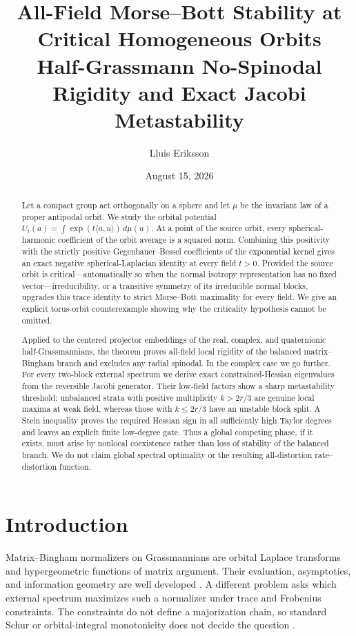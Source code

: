 \documentclass[11pt]{article}
\title{\bfseries All-Field Morse--Bott Stability at Critical Homogeneous Orbits\\[3pt]
\large Half-Grassmann No-Spinodal Rigidity and Exact Jacobi Metastability}
\author{Lluis Eriksson}
\date{August 15, 2026}
\begin{document}
\maketitle

\begin{abstract}
Let a compact group act orthogonally on a sphere and let $\mu$ be the
invariant law of a proper antipodal orbit.  We study the orbital potential
$U_t(a)=\int\exp(t\langle a,u\rangle)\,d\mu(u)$.  At a point of the source
orbit, every spherical-harmonic coefficient of the orbit average is a
squared norm.  Combining this positivity with the strictly positive
Gegenbauer--Bessel coefficients of the exponential kernel gives an exact
negative spherical-Laplacian identity at every field $t>0$.  Provided the
source orbit is critical---automatically so when the normal isotropy
representation has no fixed vector---irreducibility, or a transitive symmetry
of its irreducible normal blocks, upgrades this trace identity to strict
Morse--Bott maximality for every field.  We give an explicit torus-orbit
counterexample showing why the criticality hypothesis cannot be omitted.

Applied to the centered projector embeddings of the real, complex, and
quaternionic half-Grassmannians, the theorem proves all-field local rigidity
of the balanced matrix--Bingham branch and excludes any radial spinodal.  In
the complex case we go further.  For every two-block external spectrum we
derive exact constrained-Hessian eigenvalues from the reversible Jacobi
generator.  Their low-field factors show a sharp metastability threshold:
unbalanced strata with positive multiplicity $k>2r/3$ are genuine local
maxima at weak field, whereas those with $k\le 2r/3$ have an unstable block
split.  A Stein inequality proves the required Hessian sign in all
sufficiently high Taylor degrees and leaves an explicit finite low-degree
gate.  Thus a global competing phase, if it exists, must arise by nonlocal
coexistence rather than loss of stability of the balanced branch.  We do not
claim global spectral optimality or the resulting all-distortion
rate--distortion function.
\end{abstract}

\section{Introduction}

Matrix--Bingham normalizers on Grassmannians are orbital Laplace transforms
and hypergeometric functions of matrix argument.  Their evaluation,
asymptotics, and information geometry are well developed
\cite{James1964,Muirhead1982,Kent1994,BagyanRichards2024,CazzellaEtAl2026}.
A different problem asks which external spectrum maximizes such a normalizer
under trace and Frobenius constraints.  The constraints do not define a
majorization chain, so standard Schur or orbital-integral monotonicity does
not decide the question \cite{ItzyksonZuber1980,Sra2016,McSwiggenSahi2026}.
\end{document}
